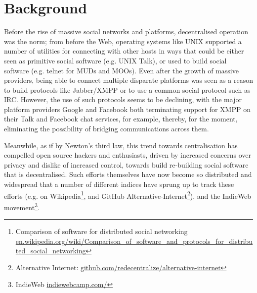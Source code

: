 \documentclass{sig-alternate}
\begin{document}

\section{Background}

Before the rise of massive social networks and platforms, decentralised operation was the norm; from before the Web, operating systems like UNIX supported a number of utilities for connecting with other hosts in ways that could be either seen as primitive social software (e.g. UNIX Talk), or used to build social software (e.g. telnet for MUDs and MOOs). Even after the growth of massive providers, being able to connect multiple disparate platforms was seen as a reason to build protocols like Jabber/XMPP\cite{saint2005streaming} or to use a common social protocol such as IRC.  However, the use of such protocols seems to be declining, with the major platform providers Google and Facebook both terminating support for XMPP on their Talk and Facebook chat services, for example, thereby, for the moment, eliminating the possibility of bridging communications across them.

Meanwhile, as if by Newton's third law, this trend towards centralisation has compelled open source hackers and enthusiasts, driven by increased concerns over privacy and dislike of increased control, towards build re-building social software that is decentralised.  Such efforts themselves have now become so distributed and widespread that a number of different indices have sprung up to track these efforts (e.g. on Wikipedia\footnote{Comparison of software for distributed social networking \url{en.wikipedia.org/wiki/Comparison_of_software_and_protocols_for_distributed_social_networking}}, and GitHub Alternative-Internet\footnote{Alternative Internet: \url{github.com/redecentralize/alternative-internet}}), and the IndieWeb movement\footnote{IndieWeb \url{indiewebcamp.com/}}. 
\end{document}
